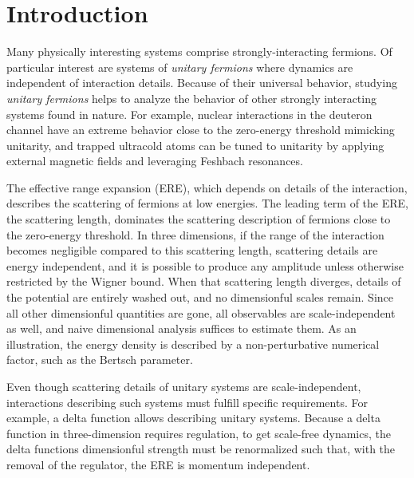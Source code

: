 \section{Introduction}\label{sec:intro}
Many physically interesting systems comprise strongly-interacting fermions.
Of particular interest are systems of \emph{unitary fermions} where dynamics are independent of interaction details.
Because of their universal behavior, studying \emph{unitary fermions} helps to analyze the behavior of other strongly interacting systems found in nature.
For example, nuclear interactions in the deuteron channel have an extreme behavior close to the zero-energy threshold mimicking unitarity, and trapped ultracold atoms can be tuned to unitarity by applying external magnetic fields and leveraging Feshbach resonances.

The effective range expansion (ERE), which depends on details of the interaction, describes the scattering of fermions at low energies.
The leading term of the ERE, the scattering length, dominates the scattering description of fermions close to the zero-energy threshold.
In three dimensions, if the range of the interaction becomes negligible compared to this scattering length, scattering details are energy independent, and it is possible to produce any amplitude unless otherwise restricted by the Wigner bound\cite{Wigner:1955zz, Phillips:1996ae, Hammer:2010fw}.
When that scattering length diverges, details of the potential are entirely washed out, and no dimensionful scales remain.
Since all other dimensionful quantities are gone, all observables are scale-independent as well, and naive dimensional analysis suffices to estimate them.
As an illustration, the energy density is described by a non-perturbative numerical factor, such as the Bertsch parameter\cite{PhysRevC.60.054311}.

Even though scattering details of unitary systems are scale-independent, interactions describing such systems must fulfill specific requirements.
For example, a delta function allows describing unitary systems.
Because a delta function in three-dimension requires regulation, to get scale-free dynamics, the delta functions dimensionful strength must be renormalized such that, with the removal of the regulator, the ERE is momentum independent.

